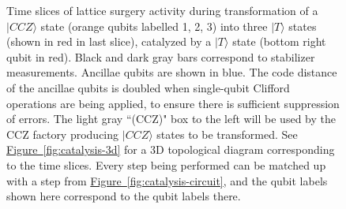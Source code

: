 \documentclass[superscriptaddress,notitlepage,longbibliography]{revtex4-1}
\newcommand{\fig}[1]{\hyperref[fig:#1]{Figure~\ref*{fig:#1}}}
\begin{document}
\begin{figure}[ht]
    \label{fig:catalysis-slices}
    \centering
    \caption{
        Time slices of lattice surgery activity during transformation of a $|CCZ\rangle$ state (orange qubits labelled 1, 2, 3) into three $|T\rangle$ states (shown in red in last slice), catalyzed by a $|T\rangle$ state (bottom right qubit in red).
        Black and dark gray bars correspond to stabilizer measurements.
        Ancillae qubits are shown in blue.
        The code distance of the ancillae qubits is doubled when single-qubit Clifford operations are being applied, to ensure there is sufficient suppression of errors.
        The light gray ``(CCZ)" box to the left will be used by the CCZ factory producing $|CCZ\rangle$ states to be transformed.
        See \fig{catalysis-3d} for a 3D topological diagram corresponding to the time slices.
        Every step being performed can be matched up with a step from \fig{catalysis-circuit}, and the qubit labels shown here correspond to the qubit labels there.
    }
\end{figure}
\end{document}
